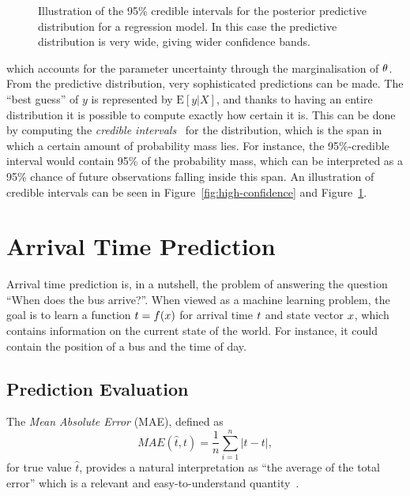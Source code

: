 \begin{figure}
\begin{minipage}{.46\textwidth}
    \caption{Illustration of the 95\% credible intervals for the
    posterior predictive distribution for a regression model. In this
    case the predictive distribution is very wide, giving wider
    confidence bands.}\label{fig:low-confidence}
  \end{minipage}
\end{figure}

which accounts for the parameter uncertainty through the
marginalisation of $\theta$. From the predictive distribution,
very sophisticated predictions can be made. The ``best guess'' of $y$
is represented by $\text{E}[y \vert X]$, and thanks to having
an entire distribution it is possible to compute exactly how certain
it is. This can be done by computing the \textit{credible
  intervals}~\cite{Morey2016Feb} for the distribution, which is the
span in which a certain amount of probability mass lies. For instance,
the 95\%-credible interval would contain 95\% of the probability mass,
which can be interpreted as a 95\% chance of future observations
falling inside this span. An illustration of credible intervals can be seen in
Figure~\ref{fig:high-confidence} and Figure~\ref{fig:low-confidence}.

\section{Arrival Time Prediction}
Arrival time prediction is, in a nutshell, the problem of answering
the question ``When does the bus arrive?''. When viewed as a machine
learning problem, the goal is to
learn a function $t = f(x)$ for arrival time $t$ and 
state vector $x$, which
contains information on the current state of the world. For instance, it
could contain the position of a bus and the time of day.

\subsection{Prediction Evaluation}
The \textit{Mean Absolute Error} (MAE), defined as
\begin{equation}
  \label{eq:mae}
  MAE(\hat{t}, t) = \frac{1}{n}\sum_{i=1}^{n}{\vert \hat{t} - t \vert},
\end{equation}
for true value $\hat{t}$, provides a natural interpretation as 
``the average of the total error'' which is a relevant
and easy-to-understand quantity~\cite{willmott2005advantages}.


